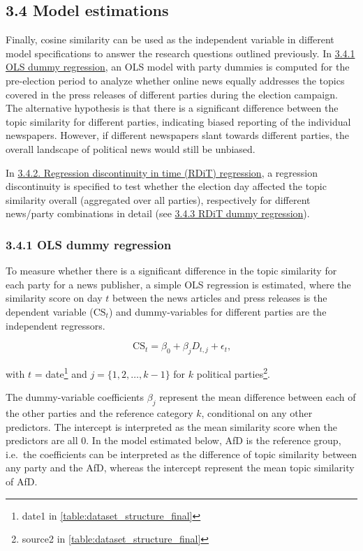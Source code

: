 \documentclass[
  12pt,
]{article}
\begin{document}
\hypertarget{model-estimations}{%
\subsection{3.4 Model estimations}\label{model-estimations}}

Finally, cosine similarity can be used as the independent variable in
different model specifications to answer the research questions outlined
previously. In \protect\hyperlink{ols-dummy-regression}{3.4.1 OLS dummy
regression}, an OLS model with party dummies is computed for the
pre-election period to analyze whether online news equally addresses the
topics covered in the press releases of different parties during the
election campaign. The alternative hypothesis is that there is a
significant difference between the topic similarity for different
parties, indicating biased reporting of the individual newspapers.
However, if different newspapers slant towards different parties, the
overall landscape of political news would still be unbiased.

In \protect\hyperlink{rdit}{3.4.2. Regression discontinuity in time
(RDiT) regression}, a regression discontinuity is specified to test
whether the election day affected the topic similarity overall
(aggregated over all parties), respectively for different news/party
combinations in detail (see \protect\hyperlink{rdit-dummy}{3.4.3 RDiT
dummy regression}).

\hypertarget{ols-dummy-regression}{%
\subsubsection{3.4.1 OLS dummy regression}\label{ols-dummy-regression}}

To measure whether there is a significant difference in the topic
similarity for each party for a news publisher, a simple OLS regression
is estimated, where the similarity score on day \(t\) between the news
articles and press releases is the dependent variable
(\(\text{CS}_{t}\)) and dummy-variables for different parties are the
independent regressors.

\[
\text{CS}_{t}=\beta_0+\beta_jD_{t,j}+\epsilon_t\text{,}
\]

with \(t\) = date\footnote{date1 in
  \autoref{table:dataset_structure_final}} and \(j=\{1,2,\dots,k-1\}\)
for \(k\) political parties\footnote{source2 in
  \autoref{table:dataset_structure_final}}.

The dummy-variable coefficients \(\beta_{j}\) represent the mean
difference between each of the other parties and the reference category
\(k\), conditional on any other predictors. The intercept is interpreted
as the mean similarity score when the predictors are all 0. In the model
estimated below, AfD is the reference group, i.e.~the coefficients can
be interpreted as the difference of topic similarity between any party
and the AfD, whereas the intercept represent the mean topic similarity
of AfD.
\end{document}
